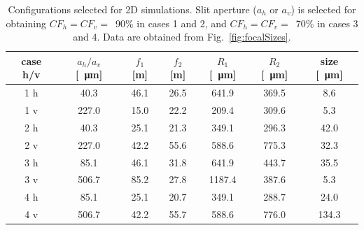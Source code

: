 \documentclass{iucr}              %
\begin{document}
\begin{table}[]
    \label{table:2Dusercases}
    \caption{Configurations selected for 2D simulations. Slit aperture ($a_h$ or $a_v$) is selected for obtaining $CF_h=CF_v=$~90\% in cases 1 and 2, and $CF_h=CF_v=$~70\% in cases 3 and 4. Data are obtained from Fig.~\ref{fig:focalSizes}.
    }
    \begin{tabular}{c|c|c|c|c|c|c}
         case h/v & $a_h/a_v$ [\SI{}{\micro\meter}] & $f_1$ [m] & $f_2$ [m] & $R_1$ [\SI{}{\micro\meter}]& $R_2$ [\SI{}{\micro\meter}] & size [\SI{}{\micro\meter}]\\
         \hline
1 h &      40.3 & 46.1 &     26.5 &     641.9 &     369.5 &     8.6 
\\
1 v &      227.0 & 15.0 &     22.2 &     209.4 &     309.6 &     5.3 
\\
\hline
2 h &      40.3 & 25.1 &     21.3 &     349.1 &     296.3 &     42.0  
\\
2 v &      227.0 & 42.2 &     55.6 &     588.6 &     775.3 &     32.3 
\\
\hline \hline
3 h &      85.1 & 46.1 &     31.8 &     641.9 &     443.7 &     35.5 
\\
3 v &      506.7 & 85.2 &     27.8 &     1187.4 &     387.6  &     5.3 
\\
\hline
4 h &      85.1 & 25.1 &     20.7 &     349.1 &     288.7 &     24.0 
\\
4 v &      506.7 & 42.2 &     55.7 &     588.6 &     776.0 &     134.3 

    \end{tabular}
\end{table}
\end{document}
